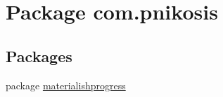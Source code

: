\hypertarget{namespacecom_1_1pnikosis}{}\section{Package com.\+pnikosis}
\label{namespacecom_1_1pnikosis}
\subsection*{Packages}
\begin{DoxyCompactItemize}
\item 
package \hyperlink{namespacecom_1_1pnikosis_1_1materialishprogress}{materialishprogress}
\end{DoxyCompactItemize}
